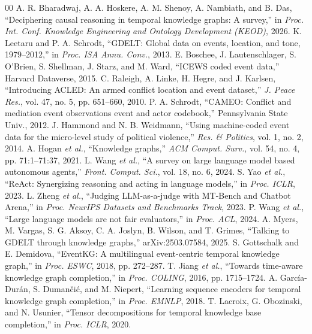 \documentclass[conference]{IEEEtran}
\begin{document}
\begin{thebibliography}{00}
 A. R. Bharadwaj, A. A. Hoskere, A. M. Shenoy, A. Nambiath, and B. Das,
``Deciphering causal reasoning in temporal knowledge graphs: A survey,'' in \textit{Proc. Int. Conf. Knowledge
Engineering and Ontology Development (KEOD)}, 2026.
 K. Leetaru and P. A. Schrodt, ``GDELT: Global data on events, location, and tone,
1979--2012,'' in \textit{Proc. ISA Annu. Conv.}, 2013.
 E. Boschee, J. Lautenschlager, S. O'Brien, S. Shellman, J. Starz, and M. Ward,
``ICEWS coded event data,'' Harvard Dataverse, 2015.
 C. Raleigh, A. Linke, H. Hegre, and J. Karlsen, ``Introducing ACLED: An armed
conflict location and event dataset,'' \textit{J. Peace Res.}, vol. 47, no. 5, pp. 651--660, 2010.
 P. A. Schrodt, ``CAMEO: Conflict and mediation event observations event and actor
codebook,'' Pennsylvania State Univ., 2012.
 J. Hammond and N. B. Weidmann, ``Using machine-coded event data for the
micro-level study of political violence,'' \textit{Res. \& Politics}, vol. 1, no. 2, 2014.
 A. Hogan \textit{et al.}, ``Knowledge graphs,'' \textit{ACM Comput. Surv.}, vol. 54,
no. 4, pp. 71:1--71:37, 2021.
 L. Wang \textit{et al.}, ``A survey on large language model based autonomous
agents,'' \textit{Front. Comput. Sci.}, vol. 18, no. 6, 2024.
 S. Yao \textit{et al.}, ``ReAct: Synergizing reasoning and acting in language
models,'' in \textit{Proc. ICLR}, 2023.
 L. Zheng \textit{et al.}, ``Judging LLM-as-a-judge with MT-Bench and Chatbot Arena,''
in \textit{Proc. NeurIPS Datasets and Benchmarks Track}, 2023.
 P. Wang \textit{et al.}, ``Large language models are not fair evaluators,'' in
\textit{Proc. ACL}, 2024.
 A. Myers, M. Vargas, S. G. Aksoy, C. A. Joslyn, B. Wilson, and T. Grimes, ``Talking
to GDELT through knowledge graphs,'' arXiv:2503.07584, 2025.
 S. Gottschalk and E. Demidova, ``EventKG: A multilingual event-centric temporal
knowledge graph,'' in \textit{Proc. ESWC}, 2018, pp. 272--287.
 T. Jiang \textit{et al.}, ``Towards time-aware knowledge graph completion,'' in
\textit{Proc. COLING}, 2016, pp. 1715--1724.
 A. Garc\'{i}a-Dur\'{a}n, S. Duman\v{c}i\'{c}, and M. Niepert, ``Learning sequence
encoders for temporal knowledge graph completion,'' in \textit{Proc. EMNLP}, 2018.
 T. Lacroix, G. Obozinski, and N. Usunier, ``Tensor decompositions for temporal
knowledge base completion,'' in \textit{Proc. ICLR}, 2020.

\end{thebibliography}
\end{document}

